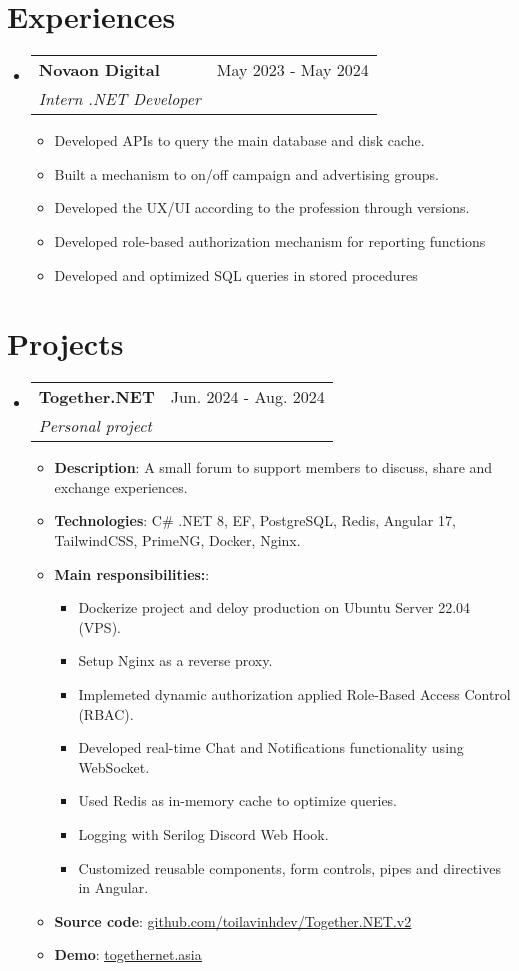 \documentclass[letterpaper,11pt]{article}
\makeatletter
\newcommand{\resumeItem}[1]{
  \item\small{
    {#1 \vspace{-2pt}}
  }
}
\newcommand{\resumeSubheading}[4]{
  \vspace{-2pt}
  \item
    \begin{tabular*}{0.97\textwidth}[t]{l@{\extracolsep{\fill}}r}
      \textbf{#1} & #2 \\
      \textit{\small#3} & \textit{\small #4} \\
    \end{tabular*}
    \vspace{-7pt}
}
\newcommand{\resumeSubHeadingListStart} {
    \begin{itemize}[leftmargin=0.15in, label={}]
}
\newcommand{\resumeSubHeadingListEnd} {
    \end{itemize}
}
\newcommand{\resumeItemListStart} {
    \begin{itemize}
}
\newcommand{\resumeItemListEnd} {
    \end{itemize} 
    \vspace{-5pt}
}
\makeatother
\begin{document}
    \section{Experiences}
        \resumeSubHeadingListStart
            \resumeSubheading {Novaon Digital} {May 2023 - May 2024} {Intern .NET Developer} {}
            \resumeItemListStart
                \resumeItem{Developed APIs to query the main database and disk cache.}
                \resumeItem{Built a mechanism to on/off campaign and advertising groups.}
                \resumeItem{Developed the UX/UI according to the profession through versions.}
                \resumeItem{Developed role-based authorization mechanism for reporting functions}
                \resumeItem{Developed and optimized SQL queries in stored procedures}
            \resumeItemListEnd
        \resumeSubHeadingListEnd
        
    \section{Projects}
        \resumeSubHeadingListStart
            \resumeSubheading {Together.NET} {Jun. 2024 - Aug. 2024} {Personal project} {}
            \resumeItemListStart
                \resumeItem{\textbf{Description}: A small forum to support members to discuss, share and exchange experiences.}
                \resumeItem{\textbf{Technologies}: C\# .NET 8, EF, PostgreSQL, Redis, Angular 17, TailwindCSS, PrimeNG, Docker, Nginx.}
                \resumeItem{\textbf{Main responsibilities:}:}
                \resumeItemListStart
                    \resumeItem{Dockerize project and deloy production on Ubuntu Server 22.04 (VPS).}
                    \resumeItem{Setup Nginx as a reverse proxy.}
                    \resumeItem{Implemeted dynamic authorization applied Role-Based Access Control (RBAC).}
                    \resumeItem{Developed real-time Chat and Notifications functionality using WebSocket.}
                    \resumeItem{Used Redis as in-memory cache to optimize queries.}
                    \resumeItem{Logging with Serilog Discord Web Hook.}
                    \resumeItem{Customized reusable components, form controls, pipes and directives in Angular.}
                \resumeItemListEnd
                \vspace{0.15cm}
                \resumeItem{
                    \textbf{Source code}: \href{https://github.com/toilavinhdev/Together.NET.v2}{\underline{github.com/toilavinhdev/Together.NET.v2}}
                }
                \resumeItem{
                    \textbf{Demo}: \href{https://togethernet.asia}{\underline{togethernet.asia}}
                }
            \resumeItemListEnd
        \resumeSubHeadingListEnd
\end{document}
